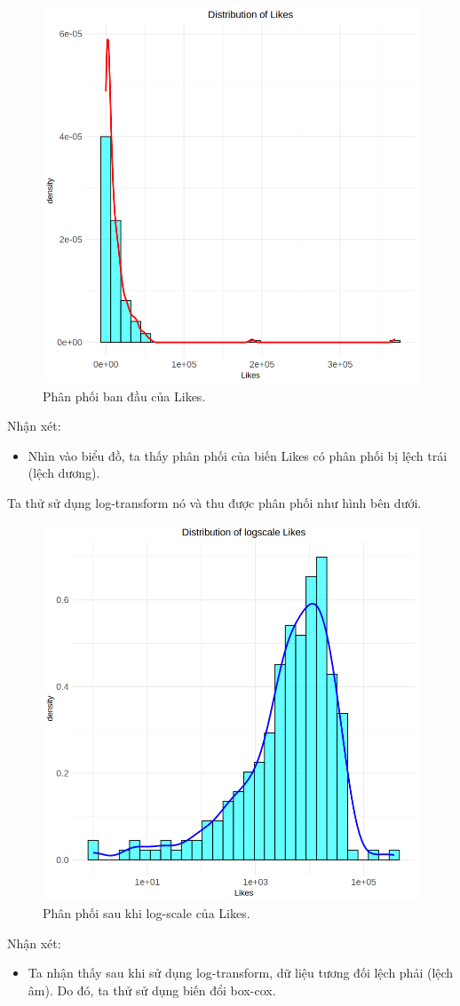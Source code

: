 \begin{figure}[H]
    \centering
    \includegraphics[width=0.75\columnwidth]{csm_figures/likes_original_distribution.png}
    \caption{Phân phối ban đầu của Likes.}
    \label{fig:likes_original_distribution}
\end{figure}

Nhận xét:
\begin{itemize}
    \item Nhìn vào biểu đồ, ta thấy phân phối của biến Likes có phân phối bị lệch trái (lệch dương).
\end{itemize}

Ta thử sử dụng log-transform nó và thu được phân phối như hình bên dưới.

\begin{figure}[H]
    \centering
    \includegraphics[width=0.75\columnwidth]{csm_figures/likes_logscale_distribution.png}
    \caption{Phân phối sau khi log-scale của Likes.}
    \label{fig:likes_logscale_distribution}
\end{figure}
Nhận xét:
\begin{itemize}
    \item Ta nhận thấy sau khi sử dụng log-transform, dữ liệu tương đối lệch phải (lệch âm). Do đó, ta thử sử dụng biến đổi box-cox.
\end{itemize}

